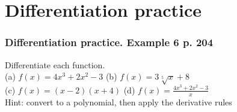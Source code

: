 \documentclass{beamer}
\begin{document}
\section{Differentiation practice}
\frame
{
  \frametitle{Differentiation practice. Example 6 p. 204}
  Differentiate each function.\\
  (a) $f(x)=4x^3+2x^2-3$  \qquad (b) $f(x)=3\sqrt[5]{x}+8$\\[10pt]
  (c) $f(x)=(x-2)(x+4)$ \qquad (d) $f(x) =\displaystyle \frac {4x^3+2x^2-3}{x}$\\[45pt]
  Hint: convert to a polynomial, then apply the derivative rules
}
\end{document}
